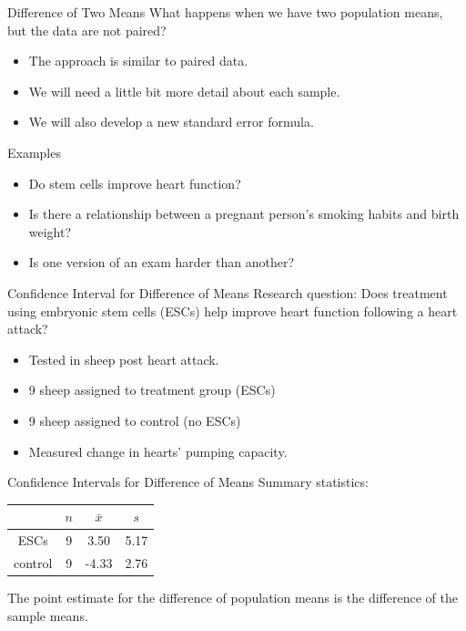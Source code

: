\begin{frame}{Difference of Two Means}
    What happens when we have two population means, but the data are not paired?
    \begin{itemize}
        \item The approach is similar to paired data.
        \item We will need a little bit more detail about each sample. 
        \item We will also develop a new standard error formula.
    \end{itemize}
\end{frame}

\begin{frame}{Examples}
    \begin{itemize}
        \item Do stem cells improve heart function?
        \item Is there a relationship between a pregnant person's smoking habits and birth weight?
        \item Is one version of an exam harder than another?
    \end{itemize}
\end{frame}

\begin{frame}{Confidence Interval for Difference of Means}
    Research question: Does treatment using embryonic stem cells (ESCs) help improve heart function following a heart attack?
    \begin{itemize}
        \item Tested in sheep post heart attack.
        \item 9 sheep assigned to treatment group (ESCs)
        \item 9 sheep assigned to control (no ESCs)
        \item Measured change in hearts' pumping capacity.
    \end{itemize}
\end{frame}

\begin{frame}{Confidence Intervals for Difference of Means}
    Summary statistics:
    \begin{table}[]
        \centering
        \begin{tabular}{cccc}
            \hline
                    & $n$ & $\bar{x}$ & $s$ \\
            \hline
            ESCs    & 9 & 3.50 & 5.17 \\
            control & 9 & -4.33 & 2.76 \\
            \hline
        \end{tabular}
    \end{table}
    \vspace{12pt}
    The point estimate for the difference of population means is the difference of the sample means.
\end{frame}

